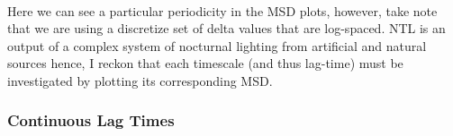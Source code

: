 \documentclass[11pt]{article}
\begin{document}
    \begin{center}
    \end{center}
    { \hspace*{\fill} \\}
    
    Here we can see a particular periodicity in the MSD plots, however, take
note that we are using a discretize set of delta values that are
log-spaced. NTL is an output of a complex system of nocturnal lighting
from artificial and natural sources hence, I reckon that each timescale
(and thus lag-time) must be investigated by plotting its corresponding
MSD.

    \subsubsection{Continuous Lag Times}\label{continuous-lag-times}
\end{document}
